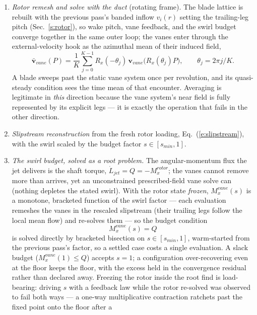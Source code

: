\documentclass[]{aiaa-tc}%
\newcommand{\eqnref}[1]{(\ref{#1})}
\begin{document}
\begin{enumerate}
\item \emph{Rotor remesh and solve with the duct} (rotating frame).
The blade lattice is rebuilt with the previous pass's banded inflow
$v_i(r)$ setting the trailing-leg pitch (Sec.~\ref{s:rotor}), so wake
pitch, vane feedback, and the swirl budget converge together in the
same outer loop; the vanes enter through the external-velocity hook as
the azimuthal mean of their induced field,
\begin{equation}
 \label{e:meanfield}
 \bar{\mathbf{v}}_{vane}(P) = \frac{1}{K} \sum_{j=0}^{K-1}
   R_x(-\theta_j)\, \mathbf{v}_{vane}\bigl( R_x(\theta_j) P \bigr),
 \qquad \theta_j = 2\pi j / K .
\end{equation}
A blade sweeps past the static vane system once per revolution, and
its quasi-steady condition sees the time mean of that encounter.
Averaging is legitimate in \emph{this} direction because the vane
system's near field is fully represented by its explicit legs --- it
is exactly the operation that fails in the other direction.
\item \emph{Slipstream reconstruction} from the fresh rotor loading,
Eq.~\eqnref{e:slipstream}, with the swirl scaled by the budget factor
$s \in [s_{min}, 1]$.
\item \emph{The swirl budget, solved as a root problem.} The
angular-momentum flux the jet delivers is the shaft torque,
$\dot{L}_{jet} = Q = -M_x^{rotor}$; the vanes cannot remove more than
arrives, yet an unconstrained prescribed-field vane solve can (nothing
depletes the stated swirl). With the rotor state \emph{frozen},
$M_x^{vane}(s)$ is a monotone, bracketed function of the swirl factor
--- each evaluation remeshes the vanes in the rescaled slipstream
(their trailing legs follow the local mean flow) and re-solves them
--- so the budget condition
\begin{equation}
 \label{e:budget}
 M_x^{vane}(s) = Q
\end{equation}
is solved directly by bracketed bisection on $s \in [s_{min}, 1]$,
warm-started from the previous pass's factor, so a settled case costs
a single evaluation. A slack budget ($M_x^{vane}(1) \le Q$) accepts
$s = 1$; a configuration over-recovering even at the floor keeps the
floor, with the excess held in the convergence residual rather than
declared away. Freezing the rotor inside the root find is
load-bearing: driving $s$ with a feedback law while the rotor
re-solved was observed to fail both ways --- a one-way multiplicative
contraction ratchets past the fixed point onto the floor after a

\end{enumerate}
\end{document}
